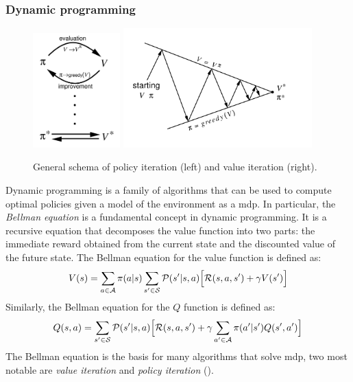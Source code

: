 \subsubsection{Dynamic programming}
\begin{figure}
  \includegraphics[width=0.3\textwidth]{chapters/img/generalized-policy-improvement.png}
  \includegraphics[width=0.65\textwidth]{chapters/img/value-iteration.png}
  \caption{General schema of policy iteration (left) and value iteration (right).}\label{fig:rl:dp}
\end{figure}
Dynamic programming is a family of algorithms that can be used to compute optimal policies 
 given a model of the environment as a \ac{mdp}.
%
In particular, the \emph{Bellman equation} is a fundamental concept in dynamic programming. 
 It is a recursive equation that decomposes the value function into two parts: 
 the immediate reward obtained from the current state and the discounted value of the future state. 
 The Bellman equation for the value function is defined as:
\begin{equation}
V(s) = \sum_{a \in \mathcal{A}} \pi(a|s) \sum_{s' \in \mathcal{S}} \mathcal{P}(s'|s, a) \Big[ \mathcal{R}(s, a, s') + \gamma V(s') \Big]
\end{equation}
%
Similarly, the Bellman equation for the $Q$ function is defined as:
\begin{equation}
Q(s, a) = \sum_{s' \in \mathcal{S}} \mathcal{P}(s'|s, a) \Big[ \mathcal{R}(s, a, s') + \gamma \sum_{a' \in \mathcal{A}} \pi(a'|s') Q(s', a') \Big]
\end{equation}
%
The Bellman equation is the basis for many algorithms that solve \ac{mdp},
two most notable are \emph{value iteration} and \emph{policy iteration} ().

